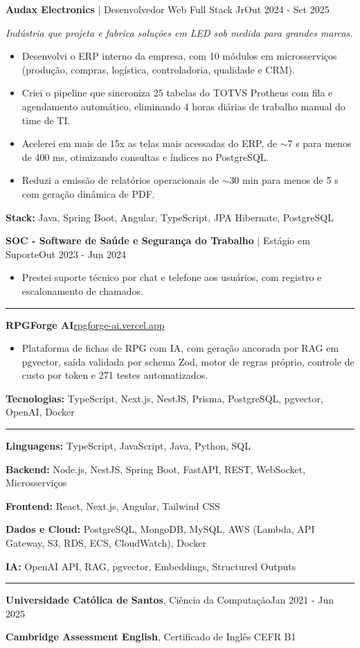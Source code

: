\documentclass[letterpaper,10pt]{article}
\newcommand{\cvsection}[1]{%
  \vspace{9pt}{\large\bfseries #1}\par\vspace{-5pt}%
  \rule{\linewidth}{0.4pt}\par\vspace{1pt}}
\newcommand{\cvheading}[3]{\textbf{#1} $|$ #2\hfill #3\par}
\newenvironment{cvitems}
  {\begin{itemize}[leftmargin=0.16in,label={},itemsep=1.5pt,topsep=2pt,parsep=0pt]}
  {\end{itemize}}
\newcommand{\cvstack}[2]{\vspace{2pt}\textbf{#1:} #2\par}
\begin{document}
\vspace{7pt}
\cvheading{Audax Electronics}{Desenvolvedor Web Full Stack Jr}{Out 2024 - Set 2025}
\textit{Indústria que projeta e fabrica soluções em LED sob medida para grandes marcas.}\par
\begin{cvitems}
  \item Desenvolvi o ERP interno da empresa, com 10 módulos em microsserviços (produção,
        compras, logística, controladoria, qualidade e CRM).
  \item Criei o pipeline que sincroniza 25 tabelas do TOTVS Protheus com fila e agendamento
        automático, eliminando 4 horas diárias de trabalho manual do time de TI.
  \item Acelerei em mais de 15x as telas mais acessadas do ERP, de $\sim$7 s para menos de 400 ms,
        otimizando consultas e índices no PostgreSQL.
  \item Reduzi a emissão de relatórios operacionais de $\sim$30 min para menos de 5 s com geração
        dinâmica de PDF.
\end{cvitems}
\cvstack{Stack}{Java, Spring Boot, Angular, TypeScript, JPA Hibernate, PostgreSQL}

\vspace{7pt}
\cvheading{SOC - Software de Saúde e Segurança do Trabalho}{Estágio em Suporte}{Out 2023 - Jun 2024}
\begin{cvitems}
  \item Prestei suporte técnico por chat e telefone aos usuários, com registro e escalonamento de chamados.
\end{cvitems}

\cvsection{Projetos}
\textbf{RPGForge AI}\hfill\href{https://rpgforge-ai.vercel.app}{rpgforge-ai.vercel.app}\par
\begin{cvitems}
  \item Plataforma de fichas de RPG com IA, com geração ancorada por RAG em pgvector, saída
        validada por schema Zod, motor de regras próprio, controle de custo por token e 271
        testes automatizados.
\end{cvitems}
\cvstack{Tecnologias}{TypeScript, Next.js, NestJS, Prisma, PostgreSQL, pgvector, OpenAI, Docker}

\cvsection{Habilidades}
\textbf{Linguagens:} TypeScript, JavaScript, Java, Python, SQL\par
\textbf{Backend:} Node.js, NestJS, Spring Boot, FastAPI, REST, WebSocket, Microsserviços\par
\textbf{Frontend:} React, Next.js, Angular, Tailwind CSS\par
\textbf{Dados e Cloud:} PostgreSQL, MongoDB, MySQL, AWS (Lambda, API Gateway, S3, RDS, ECS, CloudWatch), Docker\par
\textbf{IA:} OpenAI API, RAG, pgvector, Embeddings, Structured Outputs\par

\cvsection{Formação e Idiomas}
\textbf{Universidade Católica de Santos}, Ciência da Computação\hfill Jan 2021 - Jun 2025\par
\textbf{Cambridge Assessment English}, Certificado de Inglês CEFR B1\par
\end{document}

